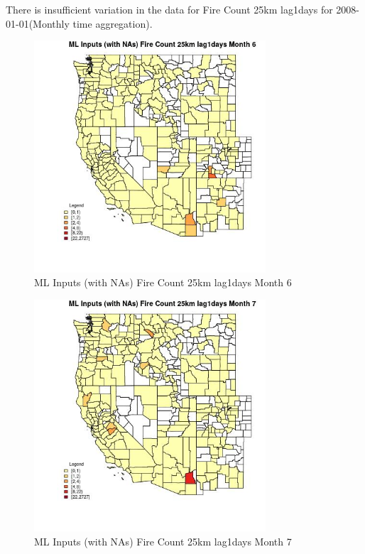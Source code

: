 There is insufficient variation in the data for Fire Count 25km lag1days for 2008-01-01(Monthly time aggregation). 
 

\begin{figure} 
\centering  
\includegraphics[width=0.77\textwidth]{Code_Outputs/Report_ML_input_PM25_Step4_part_f_de_duplicated_aveswNAs_CountyFire_Count_25km_lag1daysmedianMonth6.jpg} 
\caption{\label{fig:Report_ML_input_PM25_Step4_part_f_de_duplicated_aveswNAsCountyFire_Count_25km_lag1daysmedianMonth6}ML Inputs (with NAs) Fire Count 25km lag1days Month 6} 
\end{figure} 
 

\begin{figure} 
\centering  
\includegraphics[width=0.77\textwidth]{Code_Outputs/Report_ML_input_PM25_Step4_part_f_de_duplicated_aveswNAs_CountyFire_Count_25km_lag1daysmedianMonth7.jpg} 
\caption{\label{fig:Report_ML_input_PM25_Step4_part_f_de_duplicated_aveswNAsCountyFire_Count_25km_lag1daysmedianMonth7}ML Inputs (with NAs) Fire Count 25km lag1days Month 7} 
\end{figure} 
 

